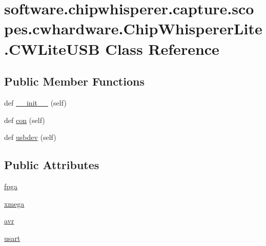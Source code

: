 \hypertarget{classsoftware_1_1chipwhisperer_1_1capture_1_1scopes_1_1cwhardware_1_1ChipWhispererLite_1_1CWLiteUSB}{}\section{software.\+chipwhisperer.\+capture.\+scopes.\+cwhardware.\+Chip\+Whisperer\+Lite.\+C\+W\+Lite\+U\+S\+B Class Reference}
\label{classsoftware_1_1chipwhisperer_1_1capture_1_1scopes_1_1cwhardware_1_1ChipWhispererLite_1_1CWLiteUSB}
\subsection*{Public Member Functions}
\begin{DoxyCompactItemize}
\item 
def \hyperlink{classsoftware_1_1chipwhisperer_1_1capture_1_1scopes_1_1cwhardware_1_1ChipWhispererLite_1_1CWLiteUSB_a9060ba0b8d41b8e4afd44ab2d54d19e9}{\+\_\+\+\_\+init\+\_\+\+\_\+} (self)
\item 
def \hyperlink{classsoftware_1_1chipwhisperer_1_1capture_1_1scopes_1_1cwhardware_1_1ChipWhispererLite_1_1CWLiteUSB_ab17d0d76791de0a5f59102ba7ad5d891}{con} (self)
\item 
def \hyperlink{classsoftware_1_1chipwhisperer_1_1capture_1_1scopes_1_1cwhardware_1_1ChipWhispererLite_1_1CWLiteUSB_ab2549a942c43837fcaba893dca65b824}{usbdev} (self)
\end{DoxyCompactItemize}
\subsection*{Public Attributes}
\begin{DoxyCompactItemize}
\item 
\hyperlink{classsoftware_1_1chipwhisperer_1_1capture_1_1scopes_1_1cwhardware_1_1ChipWhispererLite_1_1CWLiteUSB_a1cb11a0145bd9fd9bec059aada1a9378}{fpga}
\item 
\hyperlink{classsoftware_1_1chipwhisperer_1_1capture_1_1scopes_1_1cwhardware_1_1ChipWhispererLite_1_1CWLiteUSB_a20b04ca20944f70eb286cfc8cc379ee4}{xmega}
\item 
\hyperlink{classsoftware_1_1chipwhisperer_1_1capture_1_1scopes_1_1cwhardware_1_1ChipWhispererLite_1_1CWLiteUSB_aa7729cab7e3f9e151f8d53991393687f}{avr}
\item 
\hyperlink{classsoftware_1_1chipwhisperer_1_1capture_1_1scopes_1_1cwhardware_1_1ChipWhispererLite_1_1CWLiteUSB_aa30f92d3d6dd15f55b70fd615f0ab73f}{usart}
\end{DoxyCompactItemize}


